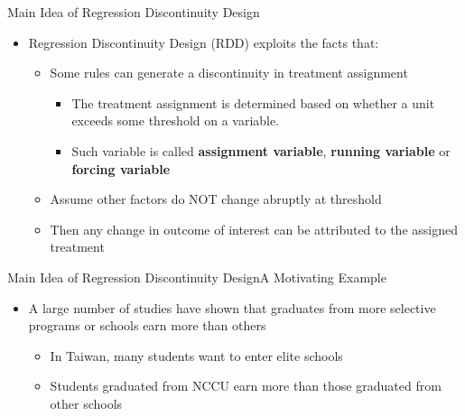 \documentclass[hyperref={pdfpagelabels=false}]{beamer}
\begin{document}
	\begin{frame}{Main Idea of Regression Discontinuity Design}{}
	\begin{itemize}
		\item Regression Discontinuity Design (RDD) exploits the facts that:
		\vspace{0.2cm}
		\begin{itemize}	
			\item Some rules can generate a discontinuity in treatment assignment
			\vspace{0.2cm}
			\begin{itemize}	
				\item The treatment assignment is determined based on whether a unit exceeds some threshold on a variable. 
				\vspace{0.2cm}
				\item Such variable is called \textbf{assignment variable}, \textbf{running variable} or \textbf{forcing variable}
			\end{itemize}
			\vspace{0.2cm}
			\item Assume other factors do NOT change abruptly at threshold
			\vspace{0.2cm}
			\item Then any change in outcome of interest can be attributed to the assigned treatment
		\end{itemize}
		
	\end{itemize}
\end{frame}

	
	
	
	
	
	
	\begin{frame}{Main Idea of Regression Discontinuity Design}{A Motivating Example}
		\begin{itemize}
			\item A large number of studies have shown that graduates from more
			selective programs or schools earn more than others
			\vspace{0.2cm}
			\begin{itemize}
				\item In Taiwan, many students want to enter elite schools
				\vspace{0.2cm}
				\item Students graduated from NCCU earn more than those graduated from other schools
			\end{itemize}
			
		\end{itemize}
	\end{frame}
	
\end{document}
